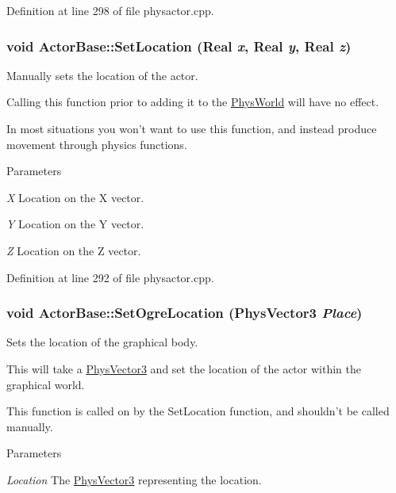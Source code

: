 Definition at line 298 of file physactor.cpp.

\hypertarget{classActorBase_a693c1bcb10ba7dc8fc37eef70ce65f0c}{
\subsubsection[{SetLocation}]{\setlength{\rightskip}{0pt plus 5cm}void ActorBase::SetLocation (Real {\em x}, \/  Real {\em y}, \/  Real {\em z})}}
\label{dd/d7b/classActorBase_a693c1bcb10ba7dc8fc37eef70ce65f0c}


Manually sets the location of the actor. 

Calling this function prior to adding it to the \hyperlink{classPhysWorld}{PhysWorld} will have no effect. \par
 In most situations you won't want to use this function, and instead produce movement through physics functions. 
\begin{DoxyParams}{Parameters}
\item[{\em X}]Location on the X vector. \item[{\em Y}]Location on the Y vector. \item[{\em Z}]Location on the Z vector. \end{DoxyParams}


Definition at line 292 of file physactor.cpp.

\hypertarget{classActorBase_a3140cc5c1c630efc1c04c20ada319b8b}{
\subsubsection[{SetOgreLocation}]{\setlength{\rightskip}{0pt plus 5cm}void ActorBase::SetOgreLocation ({\bf PhysVector3} {\em Place})}}
\label{dd/d7b/classActorBase_a3140cc5c1c630efc1c04c20ada319b8b}


Sets the location of the graphical body. 

This will take a \hyperlink{classPhysVector3}{PhysVector3} and set the location of the actor within the graphical world. \par
 This function is called on by the SetLocation function, and shouldn't be called manually. 
\begin{DoxyParams}{Parameters}
\item[{\em Location}]The \hyperlink{classPhysVector3}{PhysVector3} representing the location. \end{DoxyParams}


